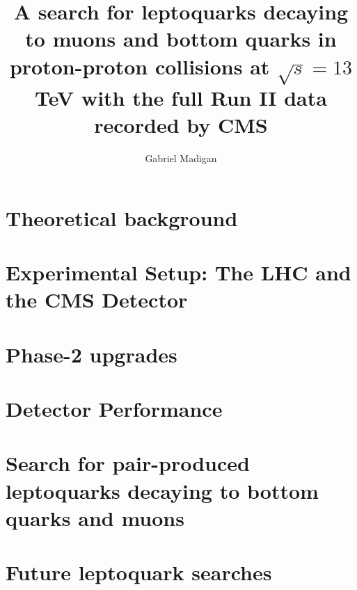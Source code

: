 \documentclass[thesis]{neu}
\title{
A search for leptoquarks decaying to muons and bottom quarks in proton-proton collisions at \texorpdfstring{$\sqrt{s}=13$}{center-of-mass energies = 13} TeV with the full Run II data recorded by CMS 
}
\author{Gabriel Madigan}
\begin{document}
\newpage 

 


%

\chapter{Theoretical background} \label{chapter:Theory}


\chapter{Experimental Setup: The LHC and the CMS Detector} \label{chapter:Experiment}


\chapter{Phase-2 upgrades} \label{chapter:Phase2Upgrades}


\chapter{Detector Performance} \label{chapter:DetectorPerformance}


\chapter{Search for pair-produced leptoquarks decaying to bottom quarks and muons} \label{chapter:LeptoquarkSearch}
   

\chapter{Future leptoquark searches} \label{chapter:FutureLQSearches}

\end{document}
